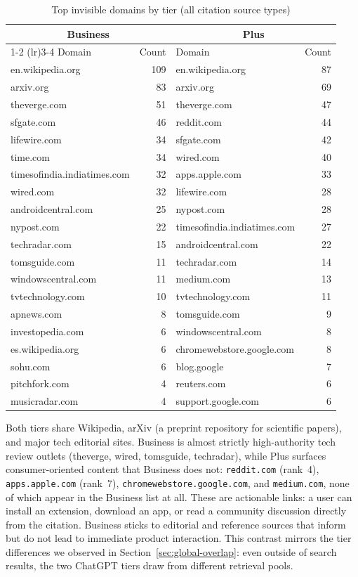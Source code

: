 \begin{table}[H]
\centering
\caption{Top invisible domains by tier (all citation source types)}
\label{tab:invisible-domains-sidebyside}
\small
\begin{tabular}{lr@{\hskip 2em}lr}
\toprule
\multicolumn{2}{c}{Business} &
\multicolumn{2}{c}{Plus} \\
\cmidrule(lr){1-2} \cmidrule(lr){3-4}
Domain & Count & Domain & Count \\
\midrule
en.wikipedia.org & 109 & en.wikipedia.org & 87 \\
arxiv.org & 83 & arxiv.org & 69 \\
theverge.com & 51 & theverge.com & 47 \\
sfgate.com & 46 & reddit.com & 44 \\
lifewire.com & 34 & sfgate.com & 42 \\
time.com & 34 & wired.com & 40 \\
timesofindia.indiatimes.com & 32 & apps.apple.com & 33 \\
wired.com & 32 & lifewire.com & 28 \\
androidcentral.com & 25 & nypost.com & 28 \\
nypost.com & 22 & timesofindia.indiatimes.com & 27 \\
techradar.com & 15 & androidcentral.com & 22 \\
tomsguide.com & 11 & techradar.com & 14 \\
windowscentral.com & 11 & medium.com & 13 \\
tvtechnology.com & 10 & tvtechnology.com & 11 \\
apnews.com & 8 & tomsguide.com & 9 \\
investopedia.com & 6 & windowscentral.com & 8 \\
es.wikipedia.org & 6 & chromewebstore.google.com & 8 \\
sohu.com & 6 & blog.google & 7 \\
pitchfork.com & 4 & reuters.com & 6 \\
musicradar.com & 4 & support.google.com & 6 \\
\bottomrule
\end{tabular}
\end{table}

\noindent Both tiers share Wikipedia, arXiv (a preprint repository for scientific papers), and major tech editorial
sites. Business is almost strictly high-authority tech review outlets
(theverge, wired, tomsguide, techradar), while Plus surfaces
consumer-oriented content that Business does not:
\texttt{reddit.com} (rank~4),
\texttt{apps.apple.com} (rank~7),
\texttt{chromewebstore.google.com}, and
\texttt{medium.com}, none of which appear in the Business list
at all. These are actionable links: a user can install an extension,
download an app, or read a community discussion directly from the
citation. Business sticks to editorial and reference sources that
inform but do not lead to immediate product interaction.
This contrast mirrors the tier differences we observed in
Section~\ref{sec:global-overlap}: even outside of search results,
the two ChatGPT tiers draw from different retrieval pools.


